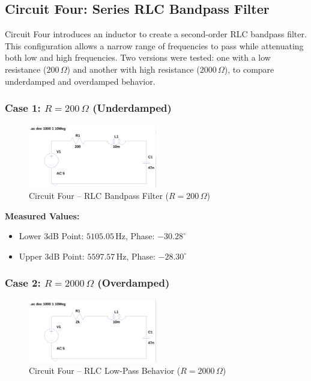 \documentclass[12pt]{article}
\begin{document}
\subsection{Circuit Four: Series RLC Bandpass Filter}
Circuit Four introduces an inductor to create a second-order RLC bandpass filter. This configuration allows a narrow range of frequencies to pass while attenuating both low and high frequencies. Two versions were tested: one with a low resistance ($200\,\Omega$) and another with high resistance ($2000\,\Omega$), to compare underdamped and overdamped behavior.

\subsubsection*{Case 1: $R = 200\,\Omega$ (Underdamped)}
\begin{figure}[H]
	\centering
	\includegraphics[width=0.5\textwidth]{e6_04}
	\caption{Circuit Four – RLC Bandpass Filter ($R = 200\,\Omega$)}
	\label{fig:circuit4a}
\end{figure}

\noindent \textbf{Measured Values:}
\begin{itemize}
	\item Lower 3dB Point: $5105.05\,\mathrm{Hz}$, Phase: $-30.28^\circ$
	\item Upper 3dB Point: $5597.57\,\mathrm{Hz}$, Phase: $-28.30^\circ$
\end{itemize}

\subsubsection*{Case 2: $R = 2000\,\Omega$ (Overdamped)}
\begin{figure}[H]
	\centering
	\includegraphics[width=0.5\textwidth]{e6_05}
	\caption{Circuit Four – RLC Low-Pass Behavior ($R = 2000\,\Omega$)}
	\label{fig:circuit4b}
\end{figure}
\end{document}

